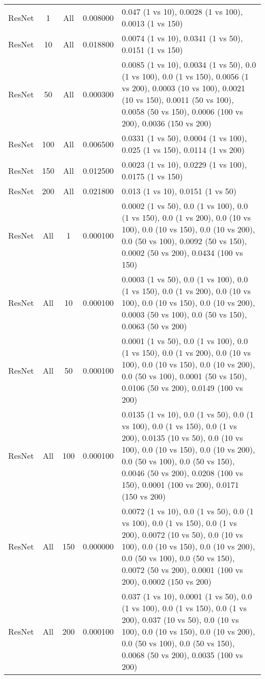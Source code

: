 \begin{tabular}{|l|c|c|c|p{7cm}|}
ResNet & 1 & All & 0.008000 & 0.047 (1 vs 10), 0.0028 (1 vs 100), 0.0013 (1 vs 150) \\
ResNet & 10 & All & 0.018800 & 0.0074 (1 vs 10), 0.0341 (1 vs 50), 0.0151 (1 vs 150) \\
ResNet & 50 & All & 0.000300 & 0.0085 (1 vs 10), 0.0034 (1 vs 50), 0.0 (1 vs 100), 0.0 (1 vs 150), 0.0056 (1 vs 200), 0.0003 (10 vs 100), 0.0021 (10 vs 150), 0.0011 (50 vs 100), 0.0058 (50 vs 150), 0.0006 (100 vs 200), 0.0036 (150 vs 200) \\
ResNet & 100 & All & 0.006500 & 0.0331 (1 vs 50), 0.0004 (1 vs 100), 0.025 (1 vs 150), 0.0114 (1 vs 200) \\
ResNet & 150 & All & 0.012500 & 0.0023 (1 vs 10), 0.0229 (1 vs 100), 0.0175 (1 vs 150) \\
ResNet & 200 & All & 0.021800 & 0.013 (1 vs 10), 0.0151 (1 vs 50) \\
ResNet & All & 1 & 0.000100 & 0.0002 (1 vs 50), 0.0 (1 vs 100), 0.0 (1 vs 150), 0.0 (1 vs 200), 0.0 (10 vs 100), 0.0 (10 vs 150), 0.0 (10 vs 200), 0.0 (50 vs 100), 0.0092 (50 vs 150), 0.0002 (50 vs 200), 0.0434 (100 vs 150) \\
ResNet & All & 10 & 0.000100 & 0.0003 (1 vs 50), 0.0 (1 vs 100), 0.0 (1 vs 150), 0.0 (1 vs 200), 0.0 (10 vs 100), 0.0 (10 vs 150), 0.0 (10 vs 200), 0.0003 (50 vs 100), 0.0 (50 vs 150), 0.0063 (50 vs 200) \\
ResNet & All & 50 & 0.000100 & 0.0001 (1 vs 50), 0.0 (1 vs 100), 0.0 (1 vs 150), 0.0 (1 vs 200), 0.0 (10 vs 100), 0.0 (10 vs 150), 0.0 (10 vs 200), 0.0 (50 vs 100), 0.0001 (50 vs 150), 0.0106 (50 vs 200), 0.0149 (100 vs 200) \\
ResNet & All & 100 & 0.000100 & 0.0135 (1 vs 10), 0.0 (1 vs 50), 0.0 (1 vs 100), 0.0 (1 vs 150), 0.0 (1 vs 200), 0.0135 (10 vs 50), 0.0 (10 vs 100), 0.0 (10 vs 150), 0.0 (10 vs 200), 0.0 (50 vs 100), 0.0 (50 vs 150), 0.0046 (50 vs 200), 0.0208 (100 vs 150), 0.0001 (100 vs 200), 0.0171 (150 vs 200) \\
ResNet & All & 150 & 0.000000 & 0.0072 (1 vs 10), 0.0 (1 vs 50), 0.0 (1 vs 100), 0.0 (1 vs 150), 0.0 (1 vs 200), 0.0072 (10 vs 50), 0.0 (10 vs 100), 0.0 (10 vs 150), 0.0 (10 vs 200), 0.0 (50 vs 100), 0.0 (50 vs 150), 0.0072 (50 vs 200), 0.0001 (100 vs 200), 0.0002 (150 vs 200) \\
ResNet & All & 200 & 0.000100 & 0.037 (1 vs 10), 0.0001 (1 vs 50), 0.0 (1 vs 100), 0.0 (1 vs 150), 0.0 (1 vs 200), 0.037 (10 vs 50), 0.0 (10 vs 100), 0.0 (10 vs 150), 0.0 (10 vs 200), 0.0 (50 vs 100), 0.0 (50 vs 150), 0.0068 (50 vs 200), 0.0035 (100 vs 200) \\

\end{tabular}
